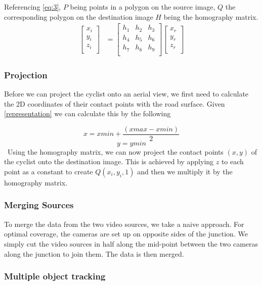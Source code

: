 Referencing \ref{eq:3}, $P$ being points in a polygon on the source image, $Q$ the corresponding polygon on the destination image $H$ being the homography matrix.
\begin{align}
\label{eq:3}
  \begin{bmatrix}
    x_{i} \\
    y_{i} \\
    z_{i} \\
  \end{bmatrix}
  &= \begin{bmatrix}
      h_1 & h_2 & h_3 \\
      h_4 & h_5 & h_6 \\
      h_7 & h_8 & h_9 \\
  \end{bmatrix}
  \begin{bmatrix}
    x_{r} \\
    y_{r} \\
    z_{r} \\
  \end{bmatrix}
\end{align}

\subsubsection{Projection}

Before we can project the cyclist onto an aerial view, we first need to calculate the 2D coordinates of their contact points with the road surface.
Given \ref{representation} we can calculate this by the following

$$x = xmin + \frac{(xmax - xmin)}{2}$$
$$y = ymin$$
\
Using the homography matrix, we can now project the contact points $(x, y)$ of the cyclist onto the destination
image. This is achieved by applying $z$ to each point as a constant to create $Q(x_i, y_i, 1)$ and then we multiply it by the homography matrix. 

\subsubsection{Merging Sources}

To merge the data from the two video sources, we take a naive approach. For optimal coverage, the cameras are set up on
opposite sides of the junction. We simply cut the video sources in half along the mid-point between
the two cameras along the junction to join them. The data is then merged.

\subsubsection{Multiple object tracking}

